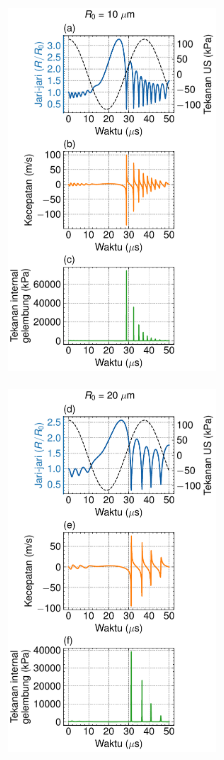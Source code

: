 \begin{figure}[h]\hspace{-2em}
    \centering
    \begin{subfigure}{.3\linewidth}
      \centering
      \includegraphics[width = 5.5cm]{Gambar/10.pdf}
    \end{subfigure}
    \hspace{1.5em}
    \begin{subfigure}{.3\linewidth}
      \centering
      \includegraphics[width = 5.5cm]{Gambar/20.pdf}
    \end{subfigure}
    \hspace{1.5em}
    \begin{subfigure}{.3\linewidth}
      \centering

\end{subfigure}
\end{figure}
